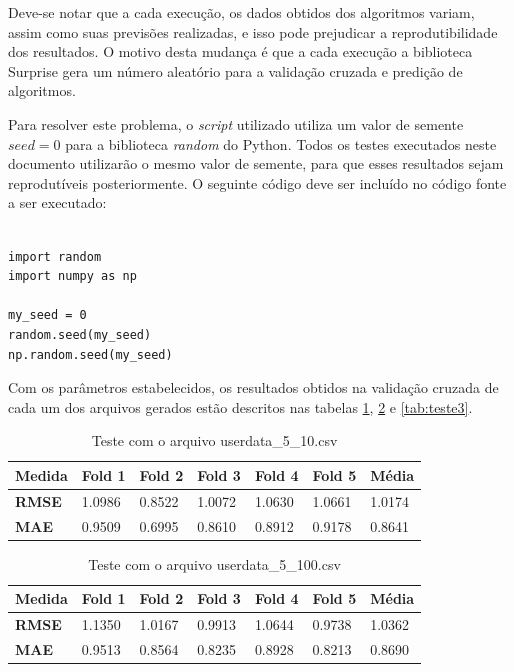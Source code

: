\documentclass[
	12pt,				%
	oneside,			%
	a4paper,			%
	chapter=TITLE,		%
	english,			%
	french,				%
	spanish,			%
	brazil				%
	]{abntex2}
\begin{document}
Deve-se notar que a cada execução, os dados obtidos dos algoritmos variam, assim como suas previsões realizadas, e isso pode prejudicar a reprodutibilidade dos resultados. O motivo desta mudança é que a cada execução a biblioteca Surprise gera um número aleatório para a validação cruzada e predição de algoritmos.

Para resolver este problema, o \emph{script} utilizado utiliza um valor de semente $seed=0$ para a biblioteca \emph{random} do Python. Todos os testes executados neste documento utilizarão o mesmo valor de semente, para que esses resultados sejam reprodutíveis posteriormente. O seguinte código deve ser incluído no código fonte a ser executado:

\begin{verbatim}

import random
import numpy as np

my_seed = 0
random.seed(my_seed)
np.random.seed(my_seed)
\end{verbatim}

Com os parâmetros estabelecidos, os resultados obtidos na validação cruzada de cada um dos arquivos gerados estão descritos nas tabelas \ref{tab:teste1}, \ref{tab:teste2} e \ref{tab:teste3}.

\begin{table}[ht]
    \centering
    \ABNTEXchapterfont
    \caption{Teste com o arquivo userdata\_5\_10.csv}
    \begin{tabular}{|m{1.5cm}|m{1.5cm}|m{1.5cm}|m{1.5cm}|m{1.5cm}|m{1.5cm}|m{1.5cm}|}
    \hline
        \textbf{Medida}& \textbf{Fold 1} & \textbf{Fold 2} & \textbf{Fold 3} & \textbf{Fold 4}& \textbf{Fold 5} & \textbf{Média}\\
        \hline
        \hline
        \textbf{RMSE} & 1.0986 & 0.8522 & 1.0072 & 1.0630 & 1.0661 & 1.0174  \\ 
        \hline
        \textbf{MAE} & 0.9509 & 0.6995 & 0.8610 & 0.8912 & 0.9178 & 0.8641 \\
        \hline
    \end{tabular}
    \label{tab:teste1}
\end{table}

\begin{table}[ht]
    \centering
    \ABNTEXchapterfont
    \caption{Teste com o arquivo userdata\_5\_100.csv}
    \begin{tabular}{|m{1.5cm}|m{1.5cm}|m{1.5cm}|m{1.5cm}|m{1.5cm}|m{1.5cm}|m{1.5cm}|}
    \hline
        \textbf{Medida}& \textbf{Fold 1} & \textbf{Fold 2} & \textbf{Fold 3} & \textbf{Fold 4}& \textbf{Fold 5} & \textbf{Média}\\
        \hline
        \hline
        \textbf{RMSE} & 1.1350 & 1.0167 & 0.9913 & 1.0644 & 0.9738 & 1.0362 \\ 
        \hline
        \textbf{MAE} & 0.9513 & 0.8564 & 0.8235 & 0.8928 & 0.8213 & 0.8690\\
        \hline
    \end{tabular}
    \label{tab:teste2}
\end{table}
\end{document}

